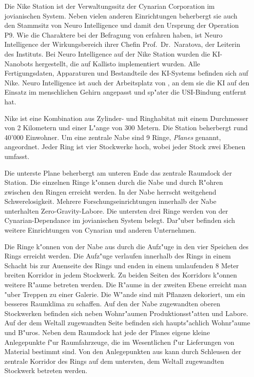 
Die Nike Station ist der Verwaltungssitz der Cynarian Corporation im jovianischen System. Neben vielen anderen Einrichtungen beherbergt sie auch den Stammsitz von Neuro Intelligence und damit den Ursprung der Operation P9. Wie die Charaktere bei der Befragung von \ml{} erfahren haben, ist Neuro Intelligence der Wirkungsbereich ihrer Chefin Prof.~Dr.~Naratova, der Leiterin des Instituts. Bei Neuro Intelligence auf der Nike Station wurden die KI-Nanobots hergestellt, die auf Kallisto implementiert wurden. Alle Fertigungsdaten, Apparaturen und Bestandteile des KI-Systems befinden sich auf Nike. Neuro Intelligence ist auch der Arbeitsplatz von \ml{}, an dem sie die KI auf den Einsatz im menschlichen Gehirn angepasst und sp"ater die USI-Bindung entfernt hat.

Nike ist eine Kombination aus Zylinder- und Ringhabitat mit einem Durchmesser von 2 Kilometern und einer L"ange von 300 Metern. Die Station beherbergt rund 40'000 Einwohner. Um eine zentrale Nabe sind 9 Ringe, \emph{Planes} genannt, angeordnet. Jeder Ring ist vier Stockwerke hoch, wobei jeder Stock zwei Ebenen umfasst. 

Die unterste Plane beherbergt am unteren Ende das zentrale Raumdock der Station. Die einzelnen Ringe k"onnen durch die Nabe und durch R"ohren zwischen den Ringen erreicht werden. In der Nabe herrscht weitgehend Schwerelosigkeit. Mehrere Forschungseinrichtungen innerhalb der Nabe unterhalten Zero-Gravity-Labore. Die untersten drei Ringe werden von der Cynarian-Dependance im jovianischen System belegt. Dar"uber befinden sich weitere Einrichtungen von Cynarian und anderen Unternehmen.

Die Ringe k"onnen von der Nabe aus durch die Aufz"uge in den vier Speichen des Rings erreicht werden. Die Aufz"uge verlaufen innerhalb des Rings in einem Schacht bis zur Au\3enseite des Rings und enden in einem umlaufenden 8 Meter breiten Korridor in jedem Stockwerk. Zu beiden Seiten des Korridors k"onnen weitere R"aume betreten werden. Die R"aume in der zweiten Ebene erreicht man "uber Treppen zu einer Galerie. Die W"ande sind mit Pflanzen dekoriert, um ein besseres Raumklima zu schaffen. Auf den der Nabe zugewandten oberen Stockwerken befinden sich neben Wohnr"aumen Produktionsst"atten und Labore. Auf der dem Weltall zugewandten Seite befinden sich haupts"achlich Wohnr"aume und B"uros. Neben dem Raumdock hat jede der Planes eigene kleine Anlegepunkte f"ur Raumfahrzeuge, die im Wesentlichen f"ur Lieferungen von Material bestimmt sind. Von den Anlegepunkten aus kann durch Schleusen der zentrale Korridor des Rings auf dem untersten, dem Weltall zugewandten Stockwerk betreten werden.

